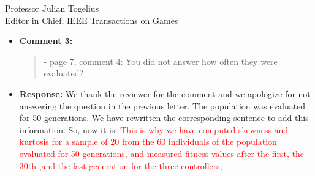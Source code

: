\documentclass[10pt]{letter} %
\begin{document}
\begin{letter}{Professor Julian Togelius \\ Editor in Chief, IEEE Transactions on Games}
\begin{enumerate}
\begin{itemize}
			\item {\bf Comment 3:}
				\begin{quote}	
					- page 7, comment 4: You did not answer how often they were evaluated?
				\end{quote}	
			\item {\bf Response:} 
			We thank the reviewer for the comment and we apologize for not answering the question in the previous letter. The population was evaluated for 50 generations. We have rewritten the corresponding sentence to add this information. So, now it is:
			\textcolor{red}{This is why we have computed skewness
				and kurtosis for a sample of 20 from the 60 individuals of
				the population evaluated for 50 generations, and measured
				fitness values after the first, the 30th ,and the last generation
				for the three controllers;}
			

\end{itemize}
\end{enumerate}
\end{letter}
\end{document}
